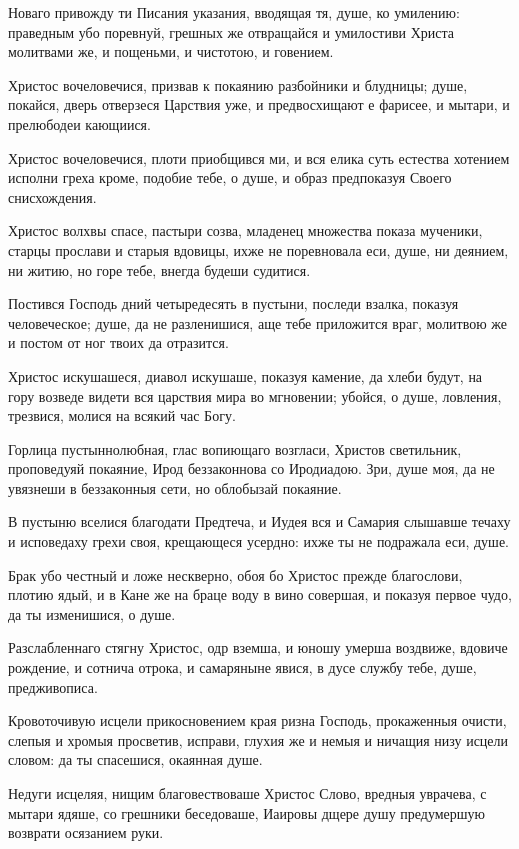 Новаго привожду ти Писания указания, вводящая тя, душе, ко умилению: праведным убо поревнуй, грешных же отвращайся и умилостиви Христа молитвами же, и пощеньми, и чистотою, и говением.

Христос вочеловечися, призвав к покаянию разбойники и блудницы; душе, покайся, дверь отверзеся Царствия уже, и предвосхищают е фарисее, и мытари, и прелюбодеи кающиися.

Христос вочеловечися, плоти приобщився ми, и вся елика суть естества хотением исполни греха кроме, подобие тебе, о душе, и образ предпоказуя Своего снисхождения.

Христос волхвы спасе, пастыри созва, младенец множества показа мученики, старцы прослави и старыя вдовицы, ихже не поревновала еси, душе, ни деянием, ни житию, но горе тебе, внегда будеши судитися.

Постився Господь дний четыредесять в пустыни, последи взалка, показуя человеческое; душе, да не разленишися, аще тебе приложится враг, молитвою же и постом от ног твоих да отразится.

Христос искушашеся, диавол искушаше, показуя камение, да хлеби будут, на гору возведе видети вся царствия мира во мгновении; убойся, о душе, ловления, трезвися, молися на всякий час Богу.

Горлица пустыннолюбная, глас вопиющаго возгласи, Христов светильник, проповедуяй покаяние, Ирод беззаконнова со Иродиадою. Зри, душе моя, да не увязнеши в беззаконныя сети, но облобызай покаяние.

В пустыню вселися благодати Предтеча, и Иудея вся и Самария слышавше течаху и исповедаху грехи своя, крещающеся усердно: ихже ты не подражала еси, душе.

Брак убо честный и ложе нескверно, обоя бо Христос прежде благослови, плотию ядый, и в Кане же на браце воду в вино совершая, и показуя первое чудо, да ты изменишися, о душе.

Разслабленнаго стягну Христос, одр вземша, и юношу умерша воздвиже, вдовиче рождение, и сотнича отрока, и самаряныне явися, в дусе службу тебе, душе, предживописа.

Кровоточивую исцели прикосновением края ризна Господь, прокаженныя очисти, слепыя и хромыя просветив, исправи, глухия же и немыя и ничащия низу исцели словом: да ты спасешися, окаянная душе.

Недуги исцеляя, нищим благовествоваше Христос Слово, вредныя уврачева, с мытари ядяше, со грешники беседоваше, Иаировы дщере душу предумершую возврати осязанием руки.

